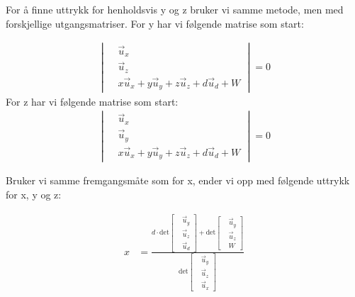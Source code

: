 For å finne uttrykk for henholdsvis y og z bruker vi samme metode, men med forskjellige utgangsmatriser. For y har vi følgende matrise som start: 

\begin{align}
    \begin{vmatrix}
	&\vec{u}_x\\
	&\vec{u}_z \\
	&x\vec{u}_x + y\vec{u}_y + z\vec{u}_z + d\vec{u}_d + W
	\end{vmatrix}
	=0
\end{align}
For z har vi følgende matrise som start: 
\begin{align}
    \begin{vmatrix}
	&\vec{u}_x\\
	&\vec{u}_y \\
	&x\vec{u}_x + y\vec{u}_y + z\vec{u}_z + d\vec{u}_d + W
	\end{vmatrix}
	=0
\end{align}

Bruker vi samme fremgangsmåte som for x, ender vi opp med følgende uttrykk for x, y og z: 

\begin{align}
     x&=\frac{d\cdot
    \text{det}
	\begin{bmatrix}
	&\vec{u}_y\\
	&\vec{u}_z \\
	&\vec{u}_d
	\end{bmatrix}+\text{det}\begin{bmatrix}
	&\vec{u}_y\\
	&\vec{u}_z \\
	&W
	\end{bmatrix}}{\text{det}\begin{bmatrix}
	&\vec{u}_y\\
	&\vec{u}_z \\
	&\vec{u}_x
	\end{bmatrix}} 
\end{align}

